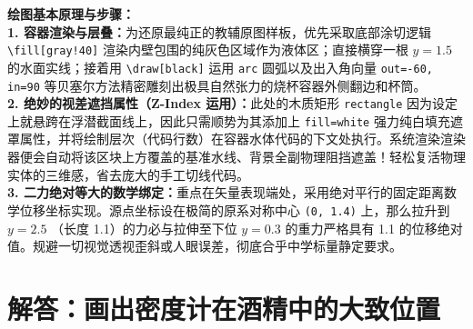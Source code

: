\vspace{0.6cm}

{\small\color{blue!70!black}
\textbf{绘图基本原理与步骤：}\\
\textbf{1. 容器渲染与层叠：}为还原最纯正的教辅原图样板，优先采取底部涂切逻辑 \texttt{\textbackslash fill[gray!40]} 渲染内壁包围的纯灰色区域作为液体区；直接横穿一根 $y=1.5$ 的水面实线；接着用 \texttt{\textbackslash draw[black]} 运用 \texttt{arc} 圆弧以及出入角向量 \texttt{out=-60, in=90} 等贝塞尔方法精密雕刻出极具自然张力的烧杯容器外侧翻边和杯筒。\\
\textbf{2. 绝妙的视差遮挡属性（Z-Index 运用）：}此处的木质矩形 \texttt{rectangle} 因为设定上就悬跨在浮潜截面线上，因此只需顺势为其添加上 \texttt{fill=white} 强力纯白填充遮罩属性，并将绘制层次（代码行数）在容器水体代码的下文处执行。系统渲染渲染器便会自动将该区块上方覆盖的基准水线、背景全副物理阻挡遮盖！轻松复活物理实体的三维感，省去庞大的手工切线代码。\\
\textbf{3. 二力绝对等大的数学绑定：}重点在矢量表现端处，采用绝对平行的固定距离数学位移坐标实现。源点坐标设在极简的原系对称中心 \texttt{(0, 1.4)} 上，那么拉升到 $y=2.5$ （长度 1.1）的力必与拉伸至下位 $y=0.3$ 的重力严格具有 1.1 的位移绝对值。规避一切视觉透视歪斜或人眼误差，彻底合乎中学标量静定要求。
}

\vspace{1.0cm}



\section{解答：画出密度计在酒精中的大致位置}

\vspace{0.6cm}

